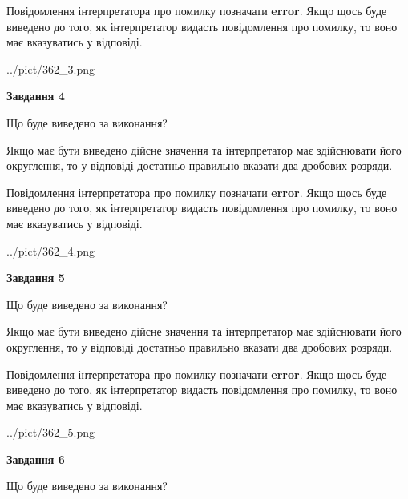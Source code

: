 \documentclass[12pt, ukrainian]{article}
\begin{document}
{\begin {Large}
Повідомлення інтерпретатора про помилку позначати \textbf{error}.
Якщо щось буде виведено до того, як інтерпретатор видасть повідомлення про помилку, 
то воно має вказуватись у відповіді. \par

\begin{center}
	{../pict/362_3.png}
\end{center}
\newpage

{\begin {center}\textbf{Завдання 4}\end {center}}\par
Що буде виведено за виконання? \par

Якщо має бути виведено дійсне значення та інтерпретатор має здійснювати його округлення, 
то у відповіді достатньо правильно вказати два дробових розряди.

Повідомлення інтерпретатора про помилку позначати \textbf{error}.
Якщо щось буде виведено до того, як інтерпретатор видасть повідомлення про помилку, 
то воно має вказуватись у відповіді. \par

\begin{center}
	{../pict/362_4.png}
\end{center}
\newpage

{\begin {center}\textbf{Завдання 5}\end {center}}\par
Що буде виведено за виконання? \par

Якщо має бути виведено дійсне значення та інтерпретатор має здійснювати його округлення, 
то у відповіді достатньо правильно вказати два дробових розряди.

Повідомлення інтерпретатора про помилку позначати \textbf{error}.
Якщо щось буде виведено до того, як інтерпретатор видасть повідомлення про помилку, 
то воно має вказуватись у відповіді. \par

\begin{center}
	{../pict/362_5.png}
\end{center}
\newpage

{\begin {center}\textbf{Завдання 6}\end {center}}\par
Що буде виведено за виконання? \par


\end{Large}}
\end{document}
